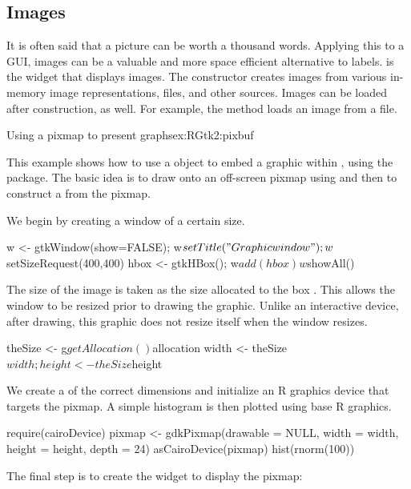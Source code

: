 \subsection{Images}
\label{sec:RGtk2:images}

It is often said that a picture can be worth a thousand
words. Applying this to a GUI, images can be a valuable and more space
efficient alternative to labels.  is the widget that
displays images. The constructor  creates images
from various in-memory image representations, files, and other
sources.  Images can be loaded after construction, as well. For
example, the  method loads an image from
a file.

\begin{example}{Using a pixmap to present graphs}{ex:RGtk2:pixbuf}

  This example shows how to use a  object to
  embed a graphic within , using the
   package. The basic idea is to draw onto an
  off-screen pixmap using  and
  then to construct a  from the pixmap. 

  We begin by creating a window of a certain size.
\begin{Schunk}
\begin{Sinput}
 w <- gtkWindow(show=FALSE); w$setTitle("Graphic window");
 w$setSizeRequest(400,400)
 hbox <- gtkHBox(); w$add(hbox)
 w$showAll()
\end{Sinput}
\end{Schunk}


The size of the image is taken as the size allocated to the box
. This allows the window to be resized prior to drawing the
graphic. Unlike an interactive device, after drawing, this graphic
does not resize itself when the window resizes.
\begin{Schunk}
\begin{Sinput}
 theSize <- g$getAllocation()$allocation
 width <- theSize$width; height <- theSize$height
\end{Sinput}
\end{Schunk}

We create a  of the correct dimensions and
initialize an R graphics device that targets the pixmap. A simple
histogram is then plotted using base R graphics.
\begin{Schunk}
\begin{Sinput}
 require(cairoDevice)
 pixmap <- gdkPixmap(drawable = NULL, 
                     width = width, height = height, depth = 24)
 asCairoDevice(pixmap)
 hist(rnorm(100))
\end{Sinput}
\end{Schunk}

The final step is to create the  widget to display the
pixmap: 
\begin{Schunk}
\end{Schunk}

\end{example}


